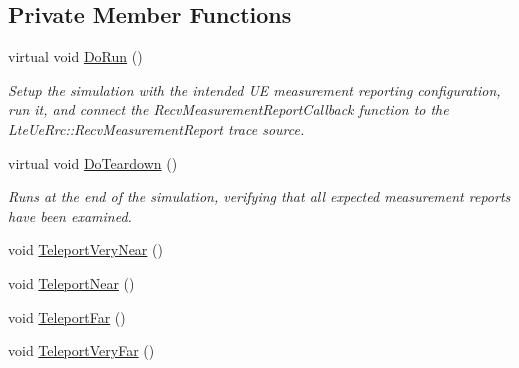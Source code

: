 \subsection*{Private Member Functions}
\begin{DoxyCompactItemize}
\item 
virtual void \hyperlink{classLteUeMeasurementsPiecewiseTestCase2_aa3d0caf8f82d095e8c85434b294482b6}{Do\+Run} ()
\begin{DoxyCompactList}\small\item\em Setup the simulation with the intended UE measurement reporting configuration, run it, and connect the {\ttfamily Recv\+Measurement\+Report\+Callback} function to the {\ttfamily Lte\+Ue\+Rrc\+::\+Recv\+Measurement\+Report} trace source. \end{DoxyCompactList}\item 
virtual void \hyperlink{classLteUeMeasurementsPiecewiseTestCase2_af30df52490d10310d41dde277a07c75f}{Do\+Teardown} ()
\begin{DoxyCompactList}\small\item\em Runs at the end of the simulation, verifying that all expected measurement reports have been examined. \end{DoxyCompactList}\item 
void \hyperlink{classLteUeMeasurementsPiecewiseTestCase2_a582eec9b9dd60c08957083693fab1af9}{Teleport\+Very\+Near} ()
\item 
void \hyperlink{classLteUeMeasurementsPiecewiseTestCase2_aba969894d5ee56960fd6d66518b8a906}{Teleport\+Near} ()
\item 
void \hyperlink{classLteUeMeasurementsPiecewiseTestCase2_aa07c9fc98cb14af186fcba52517d9275}{Teleport\+Far} ()
\item 
void \hyperlink{classLteUeMeasurementsPiecewiseTestCase2_ab62f5e0226e38678f6e2b542f6b1eb5e}{Teleport\+Very\+Far} ()
\end{DoxyCompactItemize}
